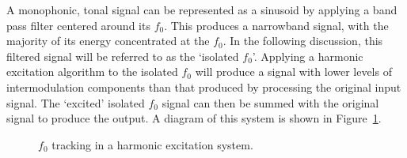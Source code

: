 		A monophonic, tonal signal can be represented as a sinusoid by applying a band pass filter centered around
		its $f_{0}$. This produces a narrowband signal, with the majority of its energy concentrated at the
		$f_{0}$.  In the following discussion, this filtered signal will be referred to as the `isolated $f_{0}$'.
		Applying a harmonic excitation algorithm to the isolated $f_{0}$ will produce a signal with lower levels of
		intermodulation components than that produced by processing the original input signal. The `excited'
		isolated $f_{0}$ signal can then be summed with the original signal to produce the output. A diagram of
		this system is shown in Figure~\ref{fig:F0Tracking}.

		\begin{figure}[h!]
			\centering
			\caption{$f_{0}$ tracking in a harmonic excitation system.}
			\label{fig:F0Tracking}
		\end{figure}

